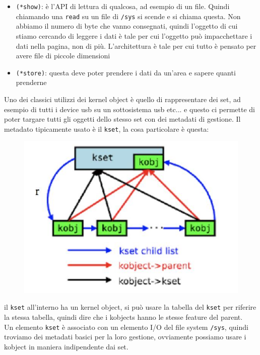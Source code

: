\documentclass[12pt, oneside]{extbook}
\begin{document}
\begin{itemize}
	\item \texttt{(*show)}: è l'API di lettura di qualcosa, ad esempio di un file. Quindi chiamando una \texttt{read} su un file di \texttt{/sys} si scende e si chiama questa. Non abbiamo il numero di byte che vanno consegnati, quindi l'oggetto di cui stiamo cercando di leggere i dati è tale per cui l'oggetto può impacchettare i dati nella pagina, non di più. L'architettura è tale per cui tutto è pensato per avere file di piccole dimensioni
	\item \texttt{(*store)}: questa deve poter prendere i dati da un'area e sapere quanti prenderne
\end{itemize}
Uno dei classici utilizzi dei kernel object è quello di rappresentare dei set, ad esempio di tutti i device usb su un sottosistema usb etc... e questo ci permette di poter targare tutti gli oggetti dello stesso set con dei metadati di gestione. Il metadato tipicamente usato è il \texttt{kset}, la cosa particolare è questa:
\begin{figure}
	\includegraphics[scale=0.7]{immagini/kset.png}
\end{figure}
il \texttt{kset} all'interno ha un kernel object, si può usare la tabella del \texttt{kset} per riferire la stessa tabella, quindi dire che i kobjects hanno le stesse feature del parent.\\Un elemento \texttt{kset} è associato con un elemento I/O del file system \texttt{/sys}, quindi troviamo dei metadati basici per la loro gestione, ovviamente possiamo usare i kobject in maniera indipendente dai set.
\end{document}
